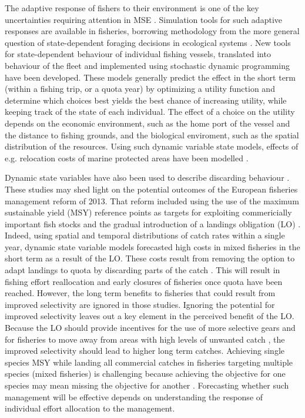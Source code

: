 \documentclass[12pt,oneline,a4paper,numbib]{ouparticle}
\numberwithin{equation}{subsection} %
\begin{document}
The adaptive response of fishers to their environment is one of the key uncertainties requiring attention in MSE \cite{Fulton2007}. Simulation tools for such adaptive responses are available in fisheries, borrowing methodology from the more general question of state-dependent foraging decisions in ecological systems \cite{ClarkandMangel2000,Houston1999}. New tools for state-dependent behaviour of individual fishing vessels, translated into behaviour of the fleet and implemented using stochastic dynamic programming \cite{Alzorriz2018,Batsleer2015, Dowling2011, Poos2010, Gillis1995} have been developed. These models generally predict the effect in the short term (within a fishing trip, or a quota year) by optimizing a utility function and determine which choices best yields the best chance of increasing utility, while keeping track of the state of each individual. The effect of a choice on the utility depends on the economic environment, such as the home port of the vessel and the distance to fishing grounds, and the biological enviroment, such as the spatial distribution of the resources. Using such dynamic variable state models, effects of e.g. relocation costs of marine protected areas have been modelled \cite{Dowling2011}.

Dynamic state variables have also been used to describe discarding behaviour \cite{Batsleer2015, Batsleer2013, Gillis1995}. These studies may shed light on the potential outcomes of the European fisheries management reform of 2013. That reform included using the use of the maximum sustainable yield (MSY) reference points as targets for exploiting commericially important fish stocks and the gradual introduction of a landings obligation (LO) \cite{CFP2013}. Indeed, using spatial and temporal distributions of catch rates within a single year, dynamic state variable models forecasted  high costs in mixed fisheries in the short term as a result of the LO. These costs result from removing the option to adapt landings to quota by discarding parts of the catch \cite{Alzorriz2018}. This will result in fishing effort reallocation and early closures of fisheries once quota have been reached. However, the  long term benefits to fisheries that could result from improved selectivity are ignored in those studies. Ignoring the potential for improved selectivity leaves out a key element in the perceived benefit of the LO. Because the LO should provide incentives for the use of more selective gears and for fisheries to  move away from areas with high levels of unwanted catch \cite{Alzorriz2016, Alzorriz2018}, the improved selectivity should lead to higher long term catches. Achieving single species MSY while landing all commercial catches in fisheries targeting multiple species (mixed fisheries) is challenging because achieving the objective for one species may mean missing the objective for another \cite{Batsleer2013,Ulrich2017}. Forecasting whether such management will be effective depends on understanding the response of individual effort allocation to the management.
\end{document}
